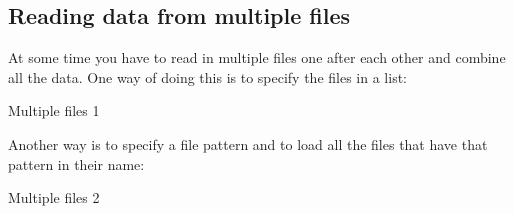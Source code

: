\subsection{Reading data from multiple files}
At some time you have to read in multiple files one after each other and combine all the data.
One way of doing this is to specify the files in a list:

\begin{tcolorbox}[enhanced jigsaw,breakable,pad at break*=1mm,
    colback=blue!5!white,colframe=babyblueeyes,title=Solutions,
    watermark color=white]
    Multiple files 1
    
\end{tcolorbox}

Another way is to specify a file pattern and to load all the files that have that pattern in their name:

\begin{tcolorbox}[enhanced jigsaw,breakable,pad at break*=1mm,
    colback=blue!5!white,colframe=babyblueeyes,title=Solutions,
    watermark color=white]
    Multiple files 2
    
\end{tcolorbox}

